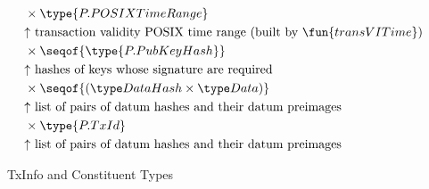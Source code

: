 \begin{figure*}[htb]
\begin{align*}
      & ~~~~ \times \type{P.POSIXTimeRange} \\
      & ~~~~ \text{$\uparrow$ transaction validity POSIX time range (built by $\fun{transVITime}$)} \\ %
      & ~~~~ \times \seqof{\type{P.PubKeyHash}}  \\
      & ~~~~\text{$\uparrow$ hashes of keys whose signature are required} \\ %
      & ~~~~ \times \seqof{(\DataHash \times \Data)}  \\
      & ~~~~ \text{$\uparrow$ list of pairs of datum hashes and their datum preimages} \\ %
      & ~~~~ \times \type{P.TxId} \\ %
      & ~~~~ \text{$\uparrow$ list of pairs of datum hashes and their datum preimages}
  \end{align*}
  \caption{TxInfo and Constituent Types}
  \label{fig:txinfo-types-two}
\end{figure*}

